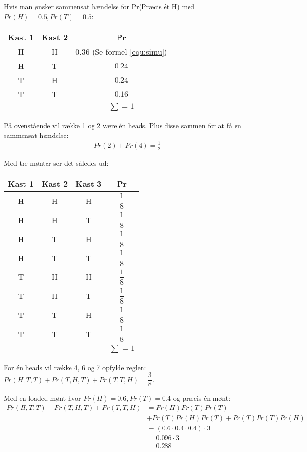 \documentclass[Main]{subfiles}
\begin{document}
Hvis man ønsker sammensat hændelse for Pr(Præcis ét H) med $Pr(H)=0.5, Pr(T)=0.5$:

\begin{table}[H]
\begin{tabular}{ccc}
Kast 1 & Kast 2 & Pr\\ \hline
H & H & $0.36$ (Se formel \ref{equ:simu})\\
H & T & $0.24$\\
T & H & $0.24$\\
T & T & $0.16$\\ \hline
& & $\sum = 1$
\end{tabular}
\end{table}
På ovenstående vil række 1 og 2 være én heads. 
Plus disse sammen for at få en sammensat hændelse:
\begin{align*}
Pr(2)+Pr(4) = \frac{1}{2}
\end{align*}

Med tre mønter ser det således ud:
\begin{table}[H]
\begin{tabular}{cccc}
Kast 1 & Kast 2 & Kast 3& Pr\\ \hline
H & H & H & $\dfrac{1}{8}$ \\
\rowcolor{gr}
H & H & T & $\dfrac{1}{8}$ \\
H & T & H & $\dfrac{1}{8}$ \\
\rowcolor{gr}
H & T & T & $\dfrac{1}{8}$ \\
T & H & H & $\dfrac{1}{8}$ \\
\rowcolor{gr}
T & H & T&  $\dfrac{1}{8}$ \\
T & T & H & $\dfrac{1}{8}$ \\
\rowcolor{gr}
T & T & T & $\dfrac{1}{8}$ \\ \hline
& & & $\sum = 1$
\end{tabular}
\end{table}
For én heads vil række 4, 6 og 7 opfylde reglen:
$Pr(H,T,T)+Pr(T,H,T)+Pr(T,T,H) = \dfrac{3}{8}$.

Med en loaded mønt hvor $Pr(H) = 0.6, Pr(T)=0.4$ og præcis én mønt:
\begin{align}
Pr(H,T,T) + Pr(T,H,T) + Pr(T,T, H) &=
Pr(H)Pr(T)Pr(T) \nonumber\\
&+Pr(T)Pr(H)Pr(T)+ Pr(T)Pr(T)Pr(H)\\
	&=(0.6 \cdot 0.4 \cdot 0.4)\cdot3\\
	&= 0.096\cdot 3\\
	&= 0.288
\end{align}
\end{document}

